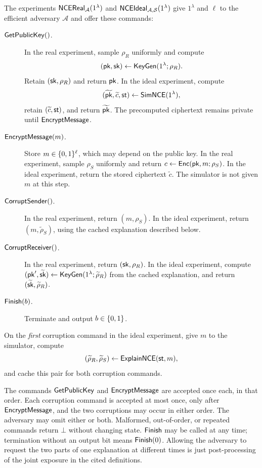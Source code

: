 The experiments $\mathsf{NCEReal}_{\mathcal A}(1^\lambda)$ and
$\mathsf{NCEIdeal}_{\mathcal A,\mathcal S}(1^\lambda)$ give $1^\lambda$ and
$\ell$ to the efficient adversary $\mathcal A$ and offer these commands:
\begin{description}
  \item[$\mathsf{GetPublicKey}()$.]
    In the real experiment, sample $\rho_R$ uniformly and compute
    \[
      (\mathsf{pk},\mathsf{sk})\gets\mathsf{KeyGen}(1^\lambda;\rho_R).
    \]
    Retain $(\mathsf{sk},\rho_R)$ and return $\mathsf{pk}$.
    In the ideal experiment, compute
    \[
      (\widetilde{\mathsf{pk}},\widetilde c,\mathsf{st})\mathrel{\leftarrow}\mathsf{SimNCE}(1^\lambda),
    \]
    retain $(\widetilde c,\mathsf{st})$, and return $\widetilde{\mathsf{pk}}$.
    The precomputed ciphertext remains private until $\mathsf{EncryptMessage}$.
  \item[$\mathsf{EncryptMessage}(m)$.]
    Store $m\in\{0,1\}^\ell$, which may depend on the public key.
    In the real experiment, sample $\rho_S$ uniformly and return
    $c\gets\mathsf{Enc}(\mathsf{pk},m;\rho_S)$.
    In the ideal experiment, return the stored ciphertext $\widetilde c$.
    The simulator is not given $m$ at this step.
  \item[$\mathsf{CorruptSender}()$.]
    In the real experiment, return $(m,\rho_S)$.
    In the ideal experiment, return $(m,\widetilde\rho_S)$, using the
    cached explanation described below.
  \item[$\mathsf{CorruptReceiver}()$.]
    In the real experiment, return $(\mathsf{sk},\rho_R)$.
    In the ideal experiment, compute
    $(\mathsf{pk}',\widetilde{\mathsf{sk}})\gets
      \mathsf{KeyGen}(1^\lambda;\widetilde\rho_R)$
    from the cached explanation, and return
    $(\widetilde{\mathsf{sk}},\widetilde\rho_R)$.
  \item[$\mathsf{Finish}(b)$.]
    Terminate and output $b\in\{0,1\}$.
\end{description}
On the \emph{first} corruption command in the ideal experiment, give
$m$ to the simulator, compute
\[
  (\widetilde\rho_R,\widetilde\rho_S)
    \mathrel{\leftarrow}\mathsf{ExplainNCE}(\mathsf{st},m),
\]
and cache this pair for both corruption commands.

The commands $\mathsf{GetPublicKey}$ and $\mathsf{EncryptMessage}$ are accepted once
each, in that order.  Each corruption command is accepted at most once,
only after $\mathsf{EncryptMessage}$, and the two corruptions may occur in either
order.  The adversary may omit either or both.  Malformed, out-of-order,
or repeated commands return $\bot$ without changing state.  $\mathsf{Finish}$
may be called at any time; termination without an output bit means
$\mathsf{Finish}(0)$.  Allowing the adversary to request the two parts of one
explanation at different times is just post-processing of the joint
exposure in the cited definitions.

